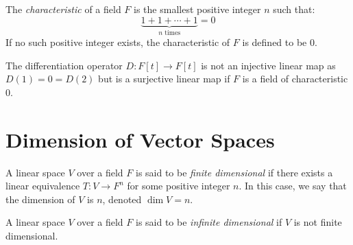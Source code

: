 \documentclass[11pt,fleqn]{book} %
\begin{document}
\begin{definition}
    The \emph{characteristic} of a field $F$ is the smallest positive integer $n$ such that:
    \[
        \underbrace{1 + 1 + \cdots + 1}_{n \text{ times}} = 0
    \]
    If no such positive integer exists, the characteristic of $F$ is defined to be $0$.    
\end{definition}

\begin{example}
    The differentiation operator $D: F[t] \to F[t]$ is not an injective linear map as $D(1) = 0 = D(2)$ but is a surjective linear map if $F$ is a field of characteristic $0$.
\end{example}

\newpage

\section{Dimension of Vector Spaces}

\begin{definition}
    A linear space $V$ over a field $F$ is said to be \emph{finite dimensional} if there exists a linear equivalence $T: V \to F^n$ for some positive integer $n$. In this case, we say that the dimension of $V$ is $n$, denoted $\dim V = n$.
\end{definition}

\begin{definition}
    A linear space $V$ over a field $F$ is said to be \emph{infinite dimensional} if $V$ is not finite dimensional.
\end{definition}

\end{document}
